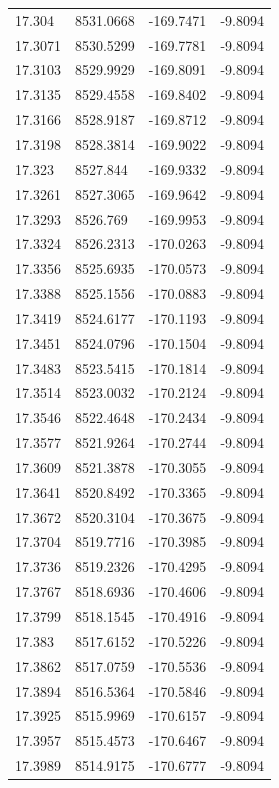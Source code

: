 \begin{table}[H]
\begin{tabular}{llll}
17.304 & 8531.0668 & -169.7471 & -9.8094 \\
17.3071 & 8530.5299 & -169.7781 & -9.8094 \\
17.3103 & 8529.9929 & -169.8091 & -9.8094 \\
17.3135 & 8529.4558 & -169.8402 & -9.8094 \\
17.3166 & 8528.9187 & -169.8712 & -9.8094 \\
17.3198 & 8528.3814 & -169.9022 & -9.8094 \\
17.323 & 8527.844 & -169.9332 & -9.8094 \\
17.3261 & 8527.3065 & -169.9642 & -9.8094 \\
17.3293 & 8526.769 & -169.9953 & -9.8094 \\
17.3324 & 8526.2313 & -170.0263 & -9.8094 \\
17.3356 & 8525.6935 & -170.0573 & -9.8094 \\
17.3388 & 8525.1556 & -170.0883 & -9.8094 \\
17.3419 & 8524.6177 & -170.1193 & -9.8094 \\
17.3451 & 8524.0796 & -170.1504 & -9.8094 \\
17.3483 & 8523.5415 & -170.1814 & -9.8094 \\
17.3514 & 8523.0032 & -170.2124 & -9.8094 \\
17.3546 & 8522.4648 & -170.2434 & -9.8094 \\
17.3577 & 8521.9264 & -170.2744 & -9.8094 \\
17.3609 & 8521.3878 & -170.3055 & -9.8094 \\
17.3641 & 8520.8492 & -170.3365 & -9.8094 \\
17.3672 & 8520.3104 & -170.3675 & -9.8094 \\
17.3704 & 8519.7716 & -170.3985 & -9.8094 \\
17.3736 & 8519.2326 & -170.4295 & -9.8094 \\
17.3767 & 8518.6936 & -170.4606 & -9.8094 \\
17.3799 & 8518.1545 & -170.4916 & -9.8094 \\
17.383 & 8517.6152 & -170.5226 & -9.8094 \\
17.3862 & 8517.0759 & -170.5536 & -9.8094 \\
17.3894 & 8516.5364 & -170.5846 & -9.8094 \\
17.3925 & 8515.9969 & -170.6157 & -9.8094 \\
17.3957 & 8515.4573 & -170.6467 & -9.8094 \\
17.3989 & 8514.9175 & -170.6777 & -9.8094 \\

\end{tabular}
\end{table}

